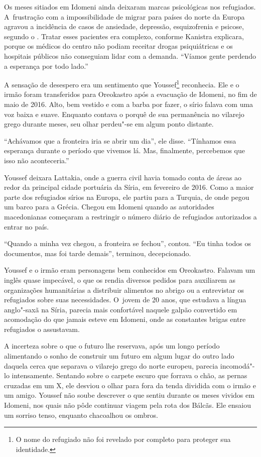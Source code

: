 Os meses sitiados em Idomeni ainda deixaram marcas psicológicas nos
refugiados. A~frustração com a impossibilidade de migrar para países do
norte da Europa agravou a incidência de casos de ansiedade, depressão,
esquizofrenia e psicose, segundo o . Tratar esses pacientes era
complexo, conforme Kanistra explicara, porque os médicos do centro não podiam receitar drogas psiquiátricas e os hospitais públicos não conseguiam lidar com a
demanda. ``Víamos gente perdendo a esperança por todo lado.''

A sensação de desespero era um sentimento que Youssef\footnote{ O nome do refugiado não foi revelado por completo
para proteger sua identidade.} 
reconhecia. Ele e o irmão foram transferidos para Oreokastro após a
evacuação de Idomeni, no fim de maio de 2016. Alto, bem vestido e com a
barba por fazer, o sírio falava com uma voz baixa e suave. Enquanto
contava o porquê de sua permanência no vilarejo grego durante meses, seu olhar
perdeu"-se em algum ponto distante.

``Achávamos que a fronteira iria se abrir um dia'', ele disse. ``Tínhamos
essa esperança durante o período que vivemos lá. Mas,
finalmente, percebemos que isso não aconteceria.''

Youssef deixara Lattakia, onde a guerra civil havia tomado conta de
áreas ao redor da principal cidade portuária da Síria, em fevereiro de
2016. Como a maior parte dos refugiados sírios na Europa, ele partiu para a
Turquia, de onde pegou um barco para a Grécia. Chegou em Idomeni quando
as autoridades macedonianas começaram a restringir o número diário de
refugiados autorizados a entrar no país.

``Quando a minha vez chegou, a fronteira se fechou'', contou. ``Eu
tinha todos os documentos, mas foi tarde demais'', terminou, decepcionado.

Youssef e o irmão eram personagens bem conhecidos em Oreokastro. Falavam
um inglês quase impecável, o que os rendia diversos pedidos para
auxiliarem as organizações humanitárias a distribuir alimentos no
abrigo ou a entrevistar os refugiados sobre suas necessidades. O~jovem
de 20 anos, que estudava a língua anglo"-saxã na Síria, parecia mais
confortável naquele galpão convertido em acomodação do que jamais esteve
em Idomeni, onde as constantes brigas entre refugiados o assustavam.

A incerteza sobre o que o futuro lhe reservava, após um longo período
alimentando o sonho de construir um futuro em algum lugar do outro lado
daquela cerca que separava o vilarejo grego do norte europeu, parecia
incomodá"-lo intensamente. Sentando sobre o carpete escuro que forrava o
chão, as pernas cruzadas em um X, ele desviou o olhar para fora da tenda
dividida com o irmão e um amigo.  Youssef não soube
descrever o que sentiu durante os meses vividos em Idomeni, nos quais
não pôde continuar viagem pela rota dos Bálcãs. Ele ensaiou um sorriso
tenso, enquanto chacoalhou os ombros.

